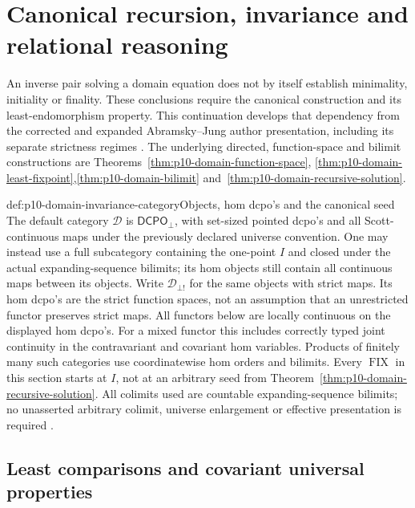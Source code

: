 \section{Canonical recursion, invariance and relational reasoning}
\label{sec:p10-domain-recursion-invariance}

An inverse pair solving a domain equation does not by itself establish
minimality, initiality or finality. These conclusions require the
canonical construction and its least-endomorphism property. This
continuation develops that dependency from the corrected and expanded
Abramsky--Jung author presentation, including its separate strictness
regimes \cite[Sections~5.2.3--5.4, pp.~73--84]
{AbramskyJungCorrectedExpandedDomainTheory}.
The underlying directed, function-space and bilimit constructions are
Theorems~\ref{thm:p10-domain-function-space},
\ref{thm:p10-domain-least-fixpoint},\ref{thm:p10-domain-bilimit}
and~\ref{thm:p10-domain-recursive-solution}.

\begin{hbconvention}{def:p10-domain-invariance-category}{Objects, hom dcpo's and the canonical seed}
The default category \(\mathcal D\) is
\(\mathsf{DCPO}_{\bot}\), with set-sized pointed dcpo's and all
Scott-continuous maps under the previously declared universe convention.
One may instead use a full subcategory containing the one-point
\(I\) and closed under the actual expanding-sequence bilimits;
its hom objects still contain all continuous maps between its objects.
Write \(\mathcal D_{\bot!}\) for the same objects with strict maps.
Its hom dcpo's are the strict function spaces, not an assumption that
an unrestricted functor preserves strict maps.
All functors below are locally continuous on the displayed hom dcpo's.
For a mixed functor this includes correctly typed joint continuity in
the contravariant and covariant hom variables. Products of finitely many
such categories use coordinatewise hom orders and bilimits.
Every \(\operatorname{FIX}\) in this section starts at \(I\),
not at an arbitrary seed from Theorem~\ref{thm:p10-domain-recursive-solution}.
All colimits used are countable expanding-sequence bilimits; no
unasserted arbitrary colimit, universe enlargement or effective
presentation is required \cite[pp.~70--74]
{AbramskyJungCorrectedExpandedDomainTheory}.
\end{hbconvention}

\subsection{Least comparisons and covariant universal properties}

